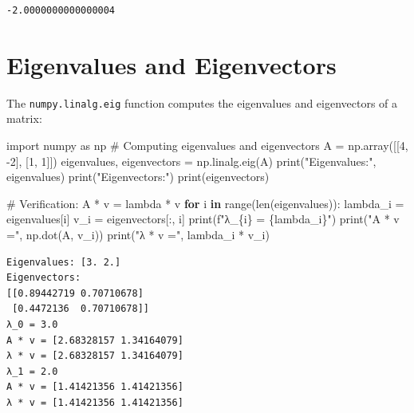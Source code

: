 \documentclass[
  english,
  letterpaper,
  DIV=11,
  numbers=noendperiod]{scrreprt}
\newenvironment{Shaded}{\begin{snugshade}}{\end{snugshade}}
\newcommand{\BuiltInTok}[1]{\textcolor[rgb]{0.00,0.23,0.31}{#1}}
\newcommand{\CommentTok}[1]{\textcolor[rgb]{0.37,0.37,0.37}{#1}}
\newcommand{\ControlFlowTok}[1]{\textcolor[rgb]{0.00,0.23,0.31}{\textbf{#1}}}
\newcommand{\DecValTok}[1]{\textcolor[rgb]{0.68,0.00,0.00}{#1}}
\newcommand{\ImportTok}[1]{\textcolor[rgb]{0.00,0.46,0.62}{#1}}
\newcommand{\KeywordTok}[1]{\textcolor[rgb]{0.00,0.23,0.31}{\textbf{#1}}}
\newcommand{\NormalTok}[1]{\textcolor[rgb]{0.00,0.23,0.31}{#1}}
\newcommand{\OperatorTok}[1]{\textcolor[rgb]{0.37,0.37,0.37}{#1}}
\newcommand{\SpecialCharTok}[1]{\textcolor[rgb]{0.37,0.37,0.37}{#1}}
\newcommand{\SpecialStringTok}[1]{\textcolor[rgb]{0.13,0.47,0.30}{#1}}
\newcommand{\StringTok}[1]{\textcolor[rgb]{0.13,0.47,0.30}{#1}}
\begin{document}
\begin{verbatim}
-2.0000000000000004
\end{verbatim}

\section{Eigenvalues and
Eigenvectors}\label{eigenvalues-and-eigenvectors}

The \texttt{numpy.linalg.eig} function computes the eigenvalues and
eigenvectors of a matrix:

\begin{Shaded}
\begin{Highlighting}[]
\ImportTok{import}\NormalTok{ numpy }\ImportTok{as}\NormalTok{ np}
\CommentTok{\# Computing eigenvalues and eigenvectors}
\NormalTok{A }\OperatorTok{=}\NormalTok{ np.array([[}\DecValTok{4}\NormalTok{, }\OperatorTok{{-}}\DecValTok{2}\NormalTok{], [}\DecValTok{1}\NormalTok{, }\DecValTok{1}\NormalTok{]])}
\NormalTok{eigenvalues, eigenvectors }\OperatorTok{=}\NormalTok{ np.linalg.eig(A)}
\BuiltInTok{print}\NormalTok{(}\StringTok{"Eigenvalues:"}\NormalTok{, eigenvalues)}
\BuiltInTok{print}\NormalTok{(}\StringTok{"Eigenvectors:"}\NormalTok{)}
\BuiltInTok{print}\NormalTok{(eigenvectors)}

\CommentTok{\# Verification: A * v = lambda * v}
\ControlFlowTok{for}\NormalTok{ i }\KeywordTok{in} \BuiltInTok{range}\NormalTok{(}\BuiltInTok{len}\NormalTok{(eigenvalues)):}
\NormalTok{    lambda\_i }\OperatorTok{=}\NormalTok{ eigenvalues[i]}
\NormalTok{    v\_i }\OperatorTok{=}\NormalTok{ eigenvectors[:, i]}
    \BuiltInTok{print}\NormalTok{(}\SpecialStringTok{f"λ\_}\SpecialCharTok{\{}\NormalTok{i}\SpecialCharTok{\}}\SpecialStringTok{ = }\SpecialCharTok{\{}\NormalTok{lambda\_i}\SpecialCharTok{\}}\SpecialStringTok{"}\NormalTok{)}
    \BuiltInTok{print}\NormalTok{(}\StringTok{"A * v ="}\NormalTok{, np.dot(A, v\_i))}
    \BuiltInTok{print}\NormalTok{(}\StringTok{"λ * v ="}\NormalTok{, lambda\_i }\OperatorTok{*}\NormalTok{ v\_i)}
\end{Highlighting}
\end{Shaded}

\begin{verbatim}
Eigenvalues: [3. 2.]
Eigenvectors:
[[0.89442719 0.70710678]
 [0.4472136  0.70710678]]
λ_0 = 3.0
A * v = [2.68328157 1.34164079]
λ * v = [2.68328157 1.34164079]
λ_1 = 2.0
A * v = [1.41421356 1.41421356]
λ * v = [1.41421356 1.41421356]
\end{verbatim}
\end{document}
